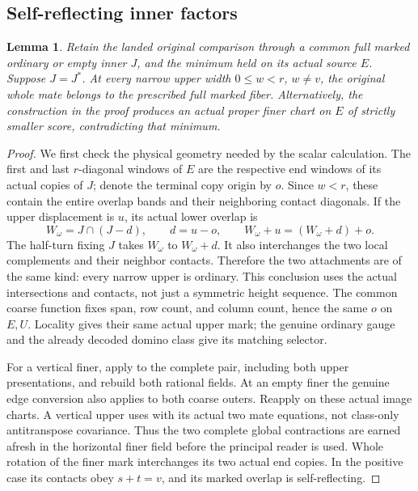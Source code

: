 \documentclass[11pt,a4paper]{amsart}
\numberwithin{equation}{section}
\theoremstyle{plain}
\newtheorem{lemma}[theorem]{Lemma}
\theoremstyle{definition}
\begin{document}
\subsection{Self-reflecting inner factors}

\begin{lemma}\label{rt:self-inner}
Retain the landed original comparison through a common full marked
ordinary or empty inner \(J\), and the minimum held on its actual source
\(E\).  Suppose \(J=J^*\).  At every narrow upper width
\(0\le w<r\), \(w\ne v\), the original whole mate belongs to the
prescribed full marked fiber.  Alternatively, the construction in the
proof produces an actual proper finer chart on \(E\) of strictly smaller
score, contradicting that minimum.
\end{lemma}
\begin{proof}
We first check the physical geometry needed by the scalar calculation.
The first and last \(r\)-diagonal windows of \(E\) are the respective
end windows of its actual copies of \(J\); denote the terminal copy
origin by \(o\).  Since \(w<r\), these contain the entire overlap
bands and their neighboring contact diagonals.  If the upper displacement
is \(u\), its actual lower overlap is
\[
 W_\omega=J\cap(J-d),\qquad d=u-o,
 \qquad W_\omega+u=(W_\omega+d)+o.
\]
The half-turn fixing \(J\) takes \(W_\omega\) to \(W_\omega+d\).
It also interchanges the two local complements and their neighbor
contacts.  Therefore the two attachments are of the same kind: every
narrow upper is ordinary.  This conclusion uses the actual intersections
and contacts, not just a symmetric height sequence.  The common coarse
function fixes span, row count, and column count, hence the same \(o\)
on \(E,U\).  Locality gives their same actual upper mark; the genuine
ordinary gauge and the already decoded domino class give its matching
selector.

For a vertical finer, apply  to the complete
pair, including both upper presentations, and rebuild both rational
fields.  At an empty finer the genuine edge conversion also applies
to both coarse outers.  Reapply  on these
actual image charts.  A vertical upper uses
 with its actual two mate equations,
not class-only antitranspose covariance.
Thus the two complete global contractions are earned afresh in
the horizontal finer field before the principal reader is used.
Whole rotation of the finer
mark interchanges its two actual end copies.  In the positive case its
contacts obey \(s+t=v\), and its marked overlap is self-reflecting.


\end{proof}
\end{document}
